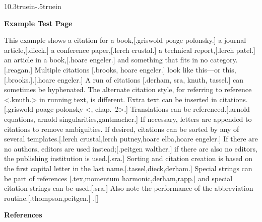 %
%
%
\vsize10.3truein\nopagenumbers\vglue-.5truein%
%
%
\centerline{\bf Example Test Page}\smallskip
This example shows a citation for a book,[.griswold poage polonsky.]
a journal article,[.dieck.] a conference paper,[.lerch crustal.]
a technical report,[.lerch patel.] an article in a book,[.hoare engeler.]
and something that fits in no category.[.reagan.]  Multiple citations 
[.brooks, hoare engeler.] look like this---or this,%
[.brooks.].[.hoare engeler.]  A run of citations [.derham, sra, knuth, tassel.]
can sometimes be hyphenated.  The alternate citation style, for referring to
reference <.knuth.> in running text, is different.  Extra text can be
inserted in citations.[.griswold poage polonsky <, chap.~2>.]  Translations
can be referenced.[.arnold equations, arnold singularities,gantmacher.]
If necessary, letters are appended to citations to remove ambiguities.
If desired, citations can be sorted by any of several templates.[.lerch 
crustal,lerch putney,hoare elba,hoare engeler.]  If there are no authors, 
editors are used instead;[.peitgen walther.] if there are also no editors, the
publishing institution is used.[.sra.]  Sorting and citation creation is 
based on the first capital letter in the last name.[.tassel,dieck,derham.]
Special strings can be part of references [.tex,momentum harmonic,derham,rapp.]
and special citation strings can be used.[.sra.]  Also note 
the performance of the abbreviation routine.[.thompson,peitgen.]
.[]\smallskip\centerline{\bf References}\smallskip  %
\bye  %
